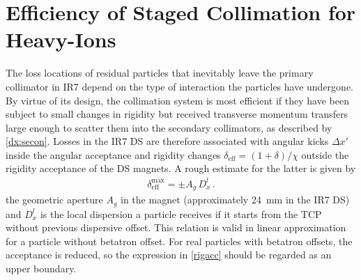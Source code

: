 \section{Efficiency of Staged Collimation for Heavy-Ions} \label{colleff:ions}


The loss locations of residual particles that inevitably leave the primary collimator in IR7 depend on the type of interaction the particles have undergone. By virtue of its design, the collimation system is most efficient if they have been subject to small changes in rigidity but  received transverse momentum transfers large enough to scatter them into the secondary collimators, as described by \eqref{dx:secon}. Losses in the IR7 DS are therefore associated with angular kicks $\Delta x'$ inside the angular acceptance and rigidity changes $\delta_\text{eff} = (1+\delta)/\chi$ outside the rigidity acceptance of the DS magnets. A rough estimate for the latter is given by 
%
\begin{align}
  \delta_\text{eff}^\text{max}  = \pm A_g \, D_x^l \, . \label{rigacc}
\end{align}
%
the geometric aperture $A_g$ in the magnet (approximately 24~mm in the IR7 DS) and $D_x^l$ is the local dispersion a particle receives if it starts from the TCP without previous dispersive offset. This relation is valid in linear approximation for a particle without betatron offset. For real particles with betatron offsets, the  acceptance is reduced, so the expression in \eqref{rigacc} should be regarded as an upper boundary. 






